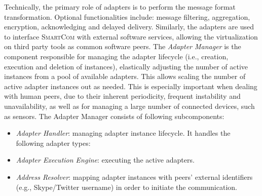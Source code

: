 \documentclass{llncs}
\newcommand{\mdl}{\textsc{SmartCom}}
\begin{document}
    Technically, the primary role of adapters is to perform the message format transformation. Optional functionalities include: message filtering, aggregation, encryption, acknowledging and delayed delivery. Similarly, the adapters are used to interface \mdl{} with external software services, allowing the virtualization on third party tools as common software peers.
    The \emph{Adapter Manager} is the component responsible for managing the adapter lifecycle (i.e., creation, execution and deletion of instances), elastically adjusting the number of active instances from a pool of available adapters. This allows scaling the number of active adapter instances out as needed. This is especially important when dealing with human peers, due to their inherent periodicity, frequent instability and unavailability, as well as for managing a large number of connected devices, such as sensors. The Adapter Manager consists of following subcomponents: 
    \begin{itemize}[$\bullet$]
      \item \emph{Adapter Handler}: managing adapter instance lifecycle. It handles the following adapter types:  
      \item \emph{Adapter Execution Engine}: executing the active adapters.
      \item \emph{Address Resolver}: mapping adapter instances with peers' external identifiers (e.g., Skype/Twitter username) in order to initiate the communication.
    \end{itemize}
\end{document}
